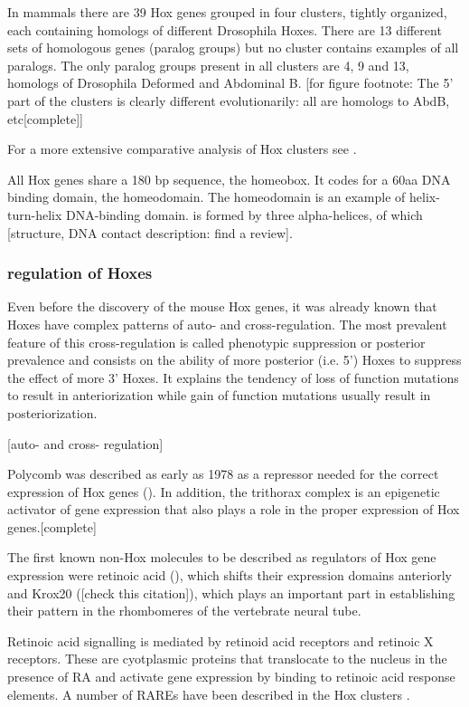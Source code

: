 In mammals there are 39 Hox genes grouped in four clusters, tightly organized, each containing homologs of different Drosophila Hoxes. There are 13 different sets of homologous genes (paralog groups) but no cluster contains examples of all paralogs. The only paralog groups present in all clusters are 4, 9 and 13, homologs of Drosophila Deformed and Abdominal B. [for figure footnote: The 5' part of the clusters is clearly different evolutionarily: all are homologs to AbdB, etc[complete]] 

For a more extensive comparative analysis of Hox clusters see \cite{Duboule2007}.

All Hox genes share a 180 bp sequence, the homeobox. It codes for a 60aa DNA binding domain, the homeodomain. The homeodomain is an example of helix-turn-helix DNA-binding domain. is formed by three alpha-helices, of which [structure, DNA contact description: find a review]. 

\subsubsection{regulation of Hoxes}

Even before the discovery of the mouse Hox genes, it was already known that Hoxes have complex patterns of auto- and cross-regulation. The most prevalent feature of this cross-regulation is called phenotypic suppression  \cite{Gonzalez-Reyes1990} or posterior prevalence \cite{Lufkin1991]} and consists on the ability of more posterior (i.e. 5') Hoxes to suppress the effect of more 3' Hoxes. It explains the tendency of loss of function mutations to result in anteriorization while gain of function mutations usually result in posteriorization.

[auto- and cross- regulation]

Polycomb was described as early as 1978 as a repressor needed for the correct expression of Hox genes (\cite{Lewis1978}). In addition, the trithorax complex is an epigenetic activator of gene expression that also plays a role in the proper expression of Hox genes.[complete]

The first known non-Hox molecules to be described as regulators of Hox gene expression were retinoic acid (\cite{Simeone1990}), which shifts their expression domains anteriorly and Krox20 (\cite{Swiatek1993}[check this citation]), which plays an important part in establishing their pattern in the rhombomeres of the vertebrate neural tube.

Retinoic acid signalling is mediated by retinoid acid receptors and retinoic X receptors. These are cyotplasmic proteins that translocate to the nucleus in the presence of RA and activate gene expression by binding to retinoic acid response elements. A number of RAREs have been described in the Hox clusters \cite{refs}. 

